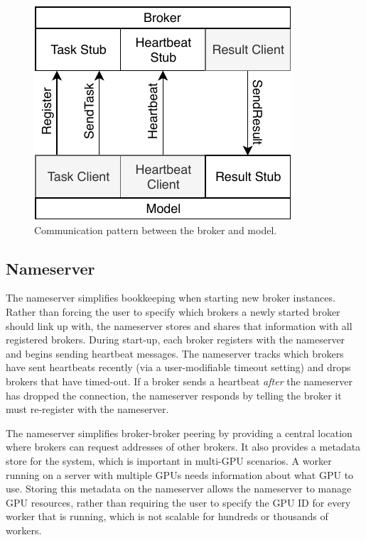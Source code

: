 \documentclass[conference]{IEEEtran}
\begin{document}
\begin{figure}
  \centering
  \includegraphics[width=.6\columnwidth]{img/model_broker}
  \caption{Communication pattern between the broker and
    model.}\label{fig:broker-model}
\end{figure}

\subsection{Nameserver}
The nameserver simplifies bookkeeping when starting new broker instances.
Rather than forcing the user to specify which brokers a newly started broker
should link up with, the nameserver stores and shares that information with all
registered brokers. During start-up, each broker registers with the nameserver
and begins sending heartbeat messages. The nameserver tracks which brokers have
sent heartbeats recently (via a user-modifiable timeout setting) and drops
brokers that have timed-out. If a broker sends a heartbeat \emph{after} the
nameserver has dropped the connection, the nameserver responds by telling the
broker it must re-register with the nameserver.

The nameserver simplifies broker-broker peering by providing a central location
where brokers can request addresses of other brokers. It also provides a metadata
store for the system, which is important in multi-GPU scenarios. A worker running
on a server with multiple GPUs needs information about what GPU to use. Storing
this metadata on the nameserver allows the nameserver to manage GPU resources,
rather than requiring the user to specify the GPU ID for every worker that is
running, which is not scalable for hundreds or thousands of workers.
\end{document}
